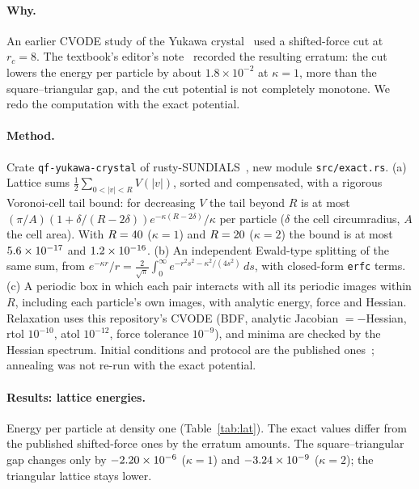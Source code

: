 \documentclass[11pt]{article}
\theoremstyle{remark}
\begin{document}
\paragraph{Why.} An earlier CVODE study of the Yukawa crystal~\cite{uo2} used a shifted-force cut at $r_c=8$. The
textbook's editor's note~\cite{txt} recorded the resulting erratum: the cut lowers the energy per particle by about
$1.8\times10^{-2}$ at $\kappa=1$, more than the square--triangular gap, and the cut potential is not completely
monotone. We redo the computation with the exact potential.

\paragraph{Method.} Crate \texttt{qf-yukawa-crystal} of rusty-SUNDIALS~\cite{rusty}, new module \texttt{src/exact.rs}.
(a) Lattice sums $\tfrac12\sum_{0<|v|<R}V(|v|)$, sorted and compensated, with a rigorous Voronoi-cell tail bound: for
decreasing $V$ the tail beyond $R$ is at most $(\pi/A)(1+\delta/(R-2\delta))e^{-\kappa(R-2\delta)}/\kappa$ per particle
($\delta$ the cell circumradius, $A$ the cell area). With $R=40$ ($\kappa=1$) and $R=20$ ($\kappa=2$) the bound is at
most $5.6\times10^{-17}$ and $1.2\times10^{-16}$. (b) An independent Ewald-type splitting of the same sum, from
$e^{-\kappa r}/r=\tfrac{2}{\sqrt\pi}\int_0^\infty e^{-r^2s^2-\kappa^2/(4s^2)}\,ds$, with closed-form \texttt{erfc} terms.
(c) A periodic box in which each pair interacts with all its periodic images within $R$, including each particle's
own images, with analytic energy, force and Hessian. Relaxation uses this repository's CVODE (BDF, analytic Jacobian
$=-$Hessian, rtol $10^{-10}$, atol $10^{-12}$, force tolerance $10^{-9}$), and minima are checked by the Hessian spectrum.
Initial conditions and protocol are the published ones~\cite{uo2}; annealing was not re-run with the exact potential.

\paragraph{Results: lattice energies.} Energy per particle at density one (Table~\ref{tab:lat}). The exact values
differ from the published shifted-force ones by the erratum amounts. The square--triangular gap changes only by
$-2.20\times10^{-6}$ ($\kappa=1$) and $-3.24\times10^{-9}$ ($\kappa=2$); the triangular lattice stays lower.
\end{document}
